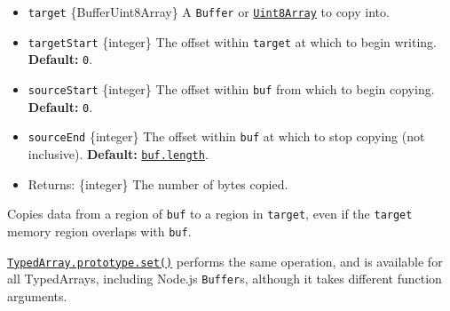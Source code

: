 \begin{itemize}
\tightlist
\item
  \texttt{target} \{Buffer\textbar Uint8Array\} A \texttt{Buffer} or
  \href{https://developer.mozilla.org/en-US/docs/Web/JavaScript/Reference/Global_Objects/Uint8Array}{\texttt{Uint8Array}}
  to copy into.
\item
  \texttt{targetStart} \{integer\} The offset within \texttt{target} at
  which to begin writing. \textbf{Default:} \texttt{0}.
\item
  \texttt{sourceStart} \{integer\} The offset within \texttt{buf} from
  which to begin copying. \textbf{Default:} \texttt{0}.
\item
  \texttt{sourceEnd} \{integer\} The offset within \texttt{buf} at which
  to stop copying (not inclusive). \textbf{Default:}
  \hyperref[buflength]{\texttt{buf.length}}.
\item
  Returns: \{integer\} The number of bytes copied.
\end{itemize}

Copies data from a region of \texttt{buf} to a region in
\texttt{target}, even if the \texttt{target} memory region overlaps with
\texttt{buf}.

\href{https://developer.mozilla.org/en-US/docs/Web/JavaScript/Reference/Global_Objects/TypedArray/set}{\texttt{TypedArray.prototype.set()}}
performs the same operation, and is available for all TypedArrays,
including Node.js \texttt{Buffer}s, although it takes different function
arguments.

